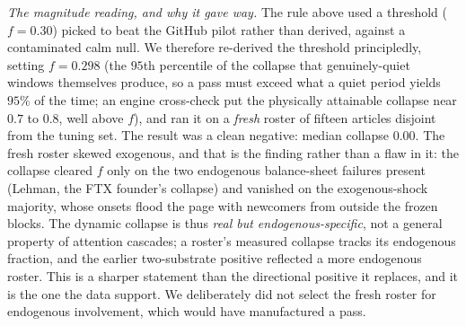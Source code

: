 \documentclass[11pt]{article}
\begin{document}
\emph{The magnitude reading, and why it gave way.} The rule above used a threshold ($f=0.30$) picked to beat the GitHub pilot rather than derived, against a contaminated calm null. We therefore re-derived the threshold principledly, setting $f=0.298$ (the $95$th percentile of the collapse that genuinely-quiet windows themselves produce, so a pass must exceed what a quiet period yields $95\%$ of the time; an engine cross-check put the physically attainable collapse near $0.7$ to $0.8$, well above $f$), and ran it on a \emph{fresh} roster of fifteen articles disjoint from the tuning set. The result was a clean negative: median collapse $0.00$. The fresh roster skewed exogenous, and that is the finding rather than a flaw in it: the collapse cleared $f$ only on the two endogenous balance-sheet failures present (Lehman, the FTX founder's collapse) and vanished on the exogenous-shock majority, whose onsets flood the page with newcomers from outside the frozen blocks. The dynamic collapse is thus \emph{real but endogenous-specific}, not a general property of attention cascades; a roster's measured collapse tracks its endogenous fraction, and the earlier two-substrate positive reflected a more endogenous roster. This is a sharper statement than the directional positive it replaces, and it is the one the data support. We deliberately did not select the fresh roster for endogenous involvement, which would have manufactured a pass.
\end{document}
